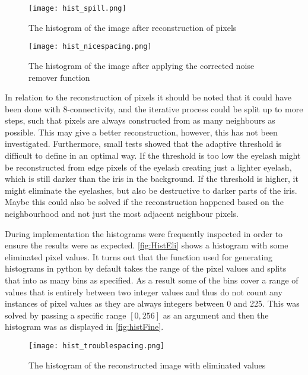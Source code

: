 \begin{figure}[H]
	\centering
	\texttt{[image: hist\_spill.png]}
	\caption{The histogram of the image after reconstruction of pixels}
	\label{fig:histSpill}
\end{figure}



\begin{figure}[H]
	\centering
	\texttt{[image: hist\_nicespacing.png]}
	\caption{The histogram of the image after applying the corrected noise remover function}
	\label{fig:histFine}
\end{figure}

In relation to the reconstruction of pixels it should be noted that it could have been done with 8-connectivity, and the iterative process could be split up to more steps, such that pixels are always constructed from as many neighbours as possible. This may give a better reconstruction, however, this has not been investigated. 
Furthermore, small tests showed that the adaptive threshold is difficult to define in an optimal way. If the threshold is too low the eyelash might be reconstructed from edge pixels of the eyelash creating just a lighter eyelash, which is still darker than the iris in the background. If the threshold is higher, it might eliminate the eyelashes, but also be destructive to darker parts of the iris. Maybe this could also be solved if the reconstruction happened based on the neighbourhood and not just the most adjacent neighbour pixels.
 
During implementation the histograms were frequently inspected in order to ensure the results were as expected. \autoref{fig:HistEli} shows a histogram with some eliminated pixel values. It turns out that the function used for generating histograms in python by default takes the range of the pixel values and splits that into as many bins as specified. As a result some of the bins cover a range of values that is entirely between two integer values and thus do not count any instances of pixel values as they are always integers between 0 and 225. This was solved by passing a specific range $[0,256]$ as an argument and then the histogram was as displayed in \autoref{fig:histFine}.

\begin{figure}[H]
	\centering
	\texttt{[image: hist\_troublespacing.png]}
	\caption{The histogram of the reconstructed image with eliminated values}
	\label{fig:HistEli}
\end{figure} 


